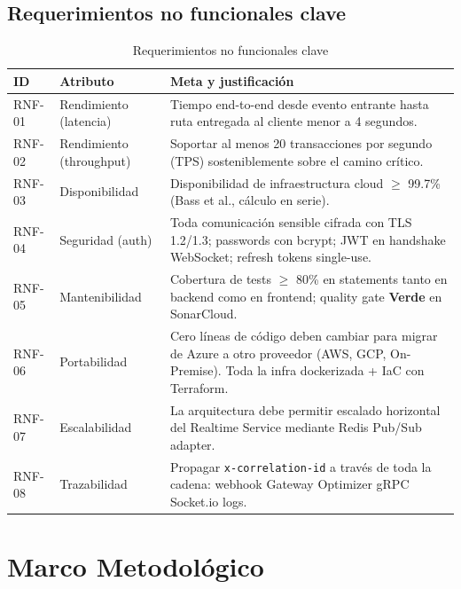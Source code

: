 \documentclass[12pt,a4paper,oneside]{article}
\begin{document}
\subsection{Requerimientos no funcionales clave}

\begin{table}[H]
\centering
\caption{Requerimientos no funcionales clave}
\label{tab:rnf-clave}
\small
\begin{tabularx}{\textwidth}{p{1.5cm} p{3.5cm} X}
\toprule
\textbf{ID} & \textbf{Atributo} & \textbf{Meta y justificaci\'on} \\
\midrule
RNF-01 & Rendimiento (latencia) & Tiempo end-to-end desde evento entrante hasta ruta entregada al cliente menor a 4 segundos. \\
RNF-02 & Rendimiento (throughput) & Soportar al menos 20 transacciones por segundo (TPS) sosteniblemente sobre el camino cr\'itico. \\
RNF-03 & Disponibilidad & Disponibilidad de infraestructura cloud $\geq$ 99.7\% (Bass et al., c\'alculo en serie). \\
RNF-04 & Seguridad (auth) & Toda comunicaci\'on sensible cifrada con TLS 1.2/1.3; passwords con bcrypt; JWT en handshake WebSocket; refresh tokens single-use. \\
RNF-05 & Mantenibilidad & Cobertura de tests $\geq$ 80\% en statements tanto en backend como en frontend; quality gate \textbf{Verde} en SonarCloud. \\
RNF-06 & Portabilidad & Cero l\'ineas de c\'odigo deben cambiar para migrar de Azure a otro proveedor (AWS, GCP, On-Premise). Toda la infra dockerizada + IaC con Terraform. \\
RNF-07 & Escalabilidad & La arquitectura debe permitir escalado horizontal del Realtime Service mediante Redis Pub/Sub adapter. \\
RNF-08 & Trazabilidad & Propagar \texttt{x-correlation-id} a trav\'es de toda la cadena: webhook \textrightarrow{} Gateway \textrightarrow{} Optimizer gRPC \textrightarrow{} Socket.io \textrightarrow{} logs. \\
\bottomrule
\end{tabularx}
\end{table}

\section{Marco Metodol\'ogico}
\end{document}
